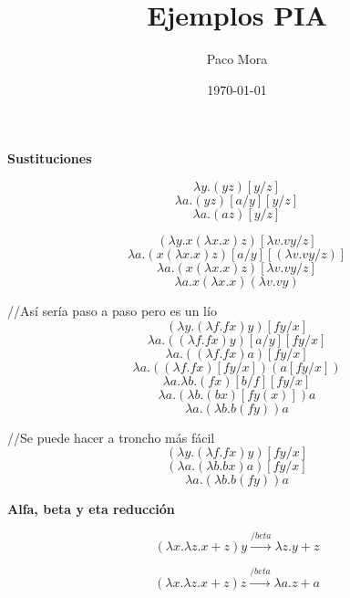 \documentclass[openany]{book}
\title{Ejemplos PIA}
\author{Paco Mora}
\date{\today}
\begin{document}
\maketitle

\textbf{Sustituciones} 

$$ \lambda y.(yz)[y/z] $$
$$ \lambda a.(yz)[a/y][y/z] $$
$$ \lambda a.(az)[y/z] $$

$$ (\lambda y.x (\lambda x.x)z )[\lambda v.vy / z] $$
$$ \lambda a. (x(\lambda x.x)z) [a / y][(\lambda v.vy / z)] $$
$$ \lambda a. (x(\lambda x.x)z) [\lambda v.vy / z] $$
$$ \lambda a.x(\lambda x.x)(\lambda v.vy) $$


//Así sería paso a paso pero es un lío
$$ (\lambda y.(\lambda f.fx)y)[fy / x] $$
$$ \lambda a.((\lambda f.fx)y)[a /y][fy /x] $$
$$ \lambda a.((\lambda f.fx)a) [fy /x] $$
$$ \lambda a.((\lambda f.fx)[fy  /x])(a [fy /x]) $$
$$ \lambda a.\lambda b.(fx)[b /f][fy /x] $$
$$ \lambda a.(\lambda b.(bx)[fy (x)])a $$
$$ \lambda a.(\lambda b.b(fy))a $$

//Se puede hacer a troncho más fácil
$$ (\lambda y.(\lambda f.fx)y)[fy / x] $$
$$ (\lambda a.(\lambda b.bx)a)[fy / x] $$
$$ \lambda a.(\lambda b.b(fy))a $$

\textbf{Alfa, beta y eta reducción }

$$ (\lambda x.\lambda z.x+z)y \xrightarrow{/beta} \lambda z.y+z $$

$$ (\lambda x.\lambda z.x+z)z \xrightarrow{/beta} \lambda a.z+a $$
\end{document}
